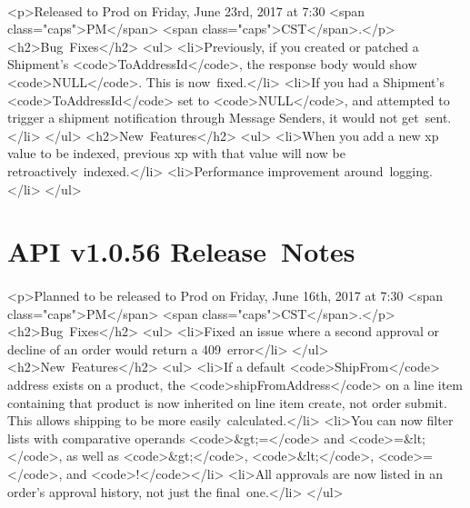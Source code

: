 \documentclass{memoir}%
\begin{document}
%
\paragraph*{}%
<p>Released to Prod on Friday, June 23rd, 2017 at 7:30 <span class="caps">PM</span> <span class="caps">CST</span>.</p>\newline%
<h2>Bug~Fixes</h2>\newline%
<ul>\newline%
<li>Previously, if you created or patched a Shipment’s <code>ToAddressId</code>, the response body would show <code>NULL</code>. This is now~fixed.</li>\newline%
<li>If you had a Shipment’s <code>ToAddressId</code> set to <code>NULL</code>, and attempted to trigger a shipment notification through Message Senders, it would not get~sent.</li>\newline%
</ul>\newline%
<h2>New~Features</h2>\newline%
<ul>\newline%
<li>When you add a new xp value to be indexed, previous xp with that value will now be retroactively~indexed.</li>\newline%
<li>Performance improvement around~logging.</li>\newline%
</ul>

%
\section*{API v1.0.56 Release~Notes}%
\paragraph*{}%

%
\paragraph*{}%
<p>Planned to be released to Prod on Friday, June 16th, 2017 at 7:30 <span class="caps">PM</span> <span class="caps">CST</span>.</p>\newline%
<h2>Bug~Fixes</h2>\newline%
<ul>\newline%
<li>Fixed an issue where a second approval or decline of an order would return a 409~error</li>\newline%
</ul>\newline%
<h2>New~Features</h2>\newline%
<ul>\newline%
<li>If a default <code>ShipFrom</code> address exists on a product, the <code>shipFromAddress</code> on a line item containing that product is now inherited on line item create, not order submit. This allows shipping to be more easily~calculated.</li>\newline%
<li>You can now filter lists with comparative operands <code>\&gt;=</code> and <code>=\&lt;</code>, as well as <code>\&gt;</code>, <code>\&lt;</code>, <code>=</code>, and <code>!</code></li>\newline%
<li>All approvals are now listed in an order’s approval history, not just the final~one.</li>\newline%
</ul>
\end{document}
